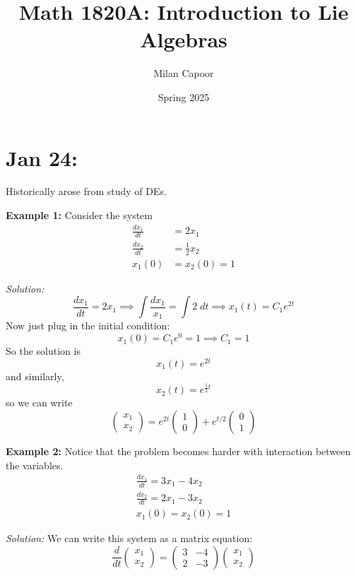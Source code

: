 \documentclass[12pt]{article}
\title{Math 1820A: Introduction to Lie Algebras}
\author{Milan Capoor}
\date{Spring 2025}
\begin{document}
\maketitle
\section{Jan 24:}
    Historically arose from study of DEs.

    \textbf{Example 1:} Consider the system 
    \begin{align}
        \frac{dx_1}{dt} &= 2x_1\\ 
        \frac{dx_2}{dt} &= \frac{1}{2}x_2\\
        x_1(0) &= x_2(0) = 1
    \end{align}

    \emph{Solution:}
    \[\frac{dx_1}{dt} = 2x_1 \implies \int \frac{dx_1}{x_1} = \int 2 \; dt \implies x_1(t) = C_1e^{2t}\]
    Now just plug in the initial condition: 
    \[x_1(0) = C_1e^0 = 1 \implies C_1 = 1\]
    So the solution is
    \[x_1(t) = e^{2t}\]
    and similarly, 
    \[x_2(t) = e^{\frac{1}{2}t}\]
    so we can write 
    \[\begin{pmatrix}
        x_1\\ x_2
    \end{pmatrix} = e^{2t} \begin{pmatrix}
        1\\0
    \end{pmatrix} + e^{t/2} \begin{pmatrix}
        0\\1
    \end{pmatrix}\]

    \textbf{Example 2:} Notice that the problem becomes harder with interaction between the variables. 
    \begin{align*}
        \frac{dx_1}{dt} = 3x_1 - 4x_2\\ 
        \frac{dx_2}{dt} = 2x_1 - 3x_2\\
        x_1(0) = x_2(0) = 1
    \end{align*}

    \emph{Solution:} We can write this system as a matrix equation:
    \[\frac{d}{dt} \begin{pmatrix}
        x_1\\x_2
    \end{pmatrix} = \begin{pmatrix}
        3 & -4\\
        2 & -3
    \end{pmatrix} \begin{pmatrix}
        x_1\\x_2
    \end{pmatrix}\]
\end{document}
